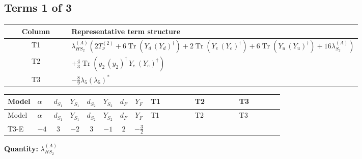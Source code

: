 \documentclass[8pt]{article}
\begin{document}
\begin{landscape}
\subsection*{Terms 1 of 3}
\begin{center}
\begin{tabular}{@{}c >{\raggedright\arraybackslash}p{0.82\linewidth}@{}}
\toprule
Column & Representative term structure \\
\midrule
T1 & \(\displaystyle {\lambda_{HS_2}^{(A)}} (2 T_{\nu}^{(2)}+6 \operatorname{Tr}\!\left({Y_d}\,\left({Y_d}\right)^{\dagger}\right)+2 \operatorname{Tr}\!\left({Y_e}\,\left({Y_e}\right)^{\dagger}\right)+6 \operatorname{Tr}\!\left({Y_u}\,\left({Y_u}\right)^{\dagger}\right)+16 {\lambda_{S_2}^{(A)}})\) \\
\midrule
T2 & \(\displaystyle +\frac{4}{3} \operatorname{Tr}\!\left({y_2}\,\left({y_2}\right)^{\dagger}\,{Y_e}\,\left({Y_e}\right)^{\dagger}\right)\) \\
\midrule
T3 & \(\displaystyle -\frac{8}{9} {\lambda_5} \left({\lambda_5}\right)^{*}\) \\
\midrule
\bottomrule
\end{tabular}
\end{center}
\smallskip
\tiny
\begin{longtable}{@{}llcccccc >{\raggedright\arraybackslash}p{0.21\linewidth} >{\raggedright\arraybackslash}p{0.21\linewidth} >{\raggedright\arraybackslash}p{0.21\linewidth}@{}}
\toprule
Model & $\alpha$ & $d_{S_1}$ & $Y_{S_1}$ & $d_{S_2}$ & $Y_{S_2}$ & $d_F$ & $Y_F$ & T1 & T2 & T3 \\
\midrule
\endfirsthead
\toprule
Model & $\alpha$ & $d_{S_1}$ & $Y_{S_1}$ & $d_{S_2}$ & $Y_{S_2}$ & $d_F$ & $Y_F$ & T1 & T2 & T3 \\
\midrule
\endhead
T3-E & $-4$ & $3$ & $-2$ & $3$ & $-1$ & $2$ & $-\frac{3}{2}$ & \scriptsize\adjustbox{max width=\linewidth}{$\begin{gathered} {\lambda_{HS_2}^{(A)}} (2 T_{\nu}^{(2)}+6 \operatorname{Tr}\!\left({Y_d}\,\left({Y_d}\right)^{\dagger}\right)+2 \operatorname{Tr}\!\left({Y_e}\,\left({Y_e}\right)^{\dagger}\right)+6 \operatorname{Tr}\!\left({Y_u}\,\left({Y_u}\right)^{\dagger}\right)+16 {\lambda_{S_2}^{(A)}})\end{gathered}$} & \scriptsize\adjustbox{max width=\linewidth}{$\begin{gathered} +\frac{4}{3} \operatorname{Tr}\!\left({y_2}\,\left({y_2}\right)^{\dagger}\,{Y_e}\,\left({Y_e}\right)^{\dagger}\right)\end{gathered}$} & \scriptsize\adjustbox{max width=\linewidth}{$\begin{gathered} -\frac{8}{9} {\lambda_5} \left({\lambda_5}\right)^{*}\end{gathered}$} \\
\midrule
\bottomrule
\end{longtable}
\clearpage
\noindent\textbf{Quantity: }$\lambda_{HS_2}^{(A)}$\par\smallskip

\end{landscape}
\end{document}
